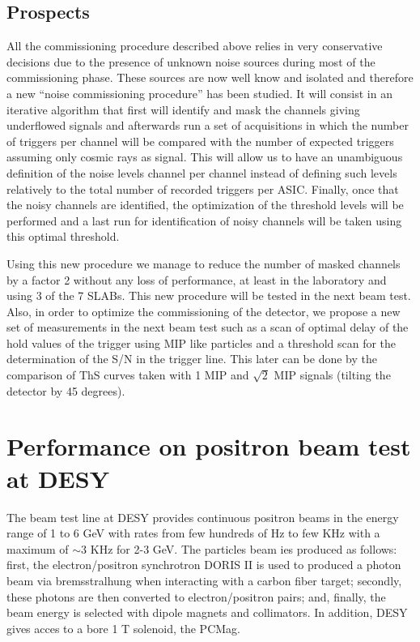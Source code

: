 \documentclass[final,3p,times,twocolumn]{elsarticle}
\begin{document}
\subsection{Prospects}
\label{sec:comm_prospects}

All the commissioning procedure described above relies in very conservative decisions
due to the presence of unknown noise sources during most of the commissioning phase. These sources are
now well know and isolated and therefore a new ``noise commissioning procedure'' has been studied.
It will consist in an iterative algorithm that first
will identify and mask the channels giving underflowed signals and afterwards run a set of acquisitions
in which the number of triggers per channel will be compared with the number of expected triggers
assuming only cosmic rays as signal. This will allow us to have an
unambiguous definition of the noise levels channel per channel instead of 
defining such levels relatively to the total number
of recorded triggers per ASIC. Finally, once that the noisy channels
are identified, the optimization of the threshold levels
will be performed and a last run for identification of noisy channels will be taken using this optimal
threshold.

Using this new procedure we manage to reduce the number of masked channels by a factor 2 without any loss of performance,
at least in the laboratory and using 3 of the 7 SLABs. This new procedure will be tested in the next beam test.
Also, in order to
optimize the commissioning of the detector,
we propose a new set of measurements in the next beam test such as
a scan of optimal delay of the hold values of the trigger using MIP like particles
and a threshold scan for the determination of the S/N in the trigger line. This later
can be done by the comparison of ThS curves taken with 1 MIP and $\sqrt{2}$ MIP signals (tilting the detector by 45 degrees).


\section{Performance on positron beam test at DESY}
\label{sec:beamtest}


The beam test line at DESY provides continuous positron beams in the energy range of 1 to 6 GeV with
rates from few hundreds of Hz to few KHz with a maximum of $\sim 3$ KHz for 2-3 GeV. 
The particles beam ies produced as follows: first, the electron/positron synchrotron DORIS II 
is used to produced a photon beam via bremsstralhung when interacting with a carbon fiber target;
secondly, these photons are then converted to electron/positron pairs; 
and, finally, the beam energy is selected with dipole magnets and collimators. 
In addition, DESY gives acces to a bore 1 T solenoid, the PCMag.
\end{document}
